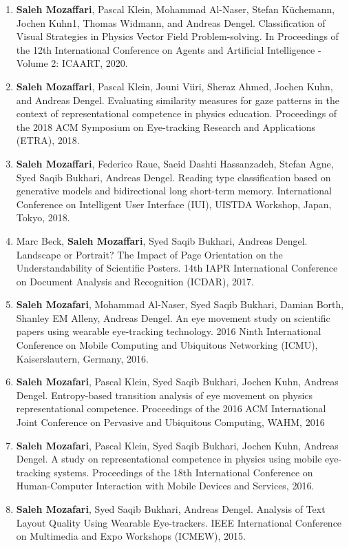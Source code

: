 \begin{enumerate}
	\item \textbf{Saleh Mozaffari}, Pascal Klein, Mohammad Al-Naser, Stefan Küchemann, Jochen Kuhn1, Thomas Widmann, and Andreas Dengel. Classification of Visual Strategies in Physics Vector Field Problem-solving. In Proceedings of the 12th International Conference on Agents and Artificial Intelligence - Volume 2: ICAART, 2020.
	\item \textbf{Saleh Mozaffari}, Pascal Klein, Jouni Viiri, Sheraz Ahmed, Jochen Kuhn, and Andreas Dengel.  Evaluating similarity measures for gaze patterns in the context of representational competence in physics education. Proceedings of the 2018 ACM Symposium on Eye-tracking Research and Applications (ETRA), 2018.
	\item \textbf{Saleh Mozaffari}, Federico Raue, Saeid Dashti Hassanzadeh, Stefan Agne, Syed Saqib Bukhari, Andreas Dengel. Reading type classification based on generative models and bidirectional long short-term memory. International Conference on Intelligent User Interface (IUI), UISTDA Workshop, Japan, Tokyo, 2018.
	\item Marc Beck, \textbf{Saleh Mozaffari}, Syed Saqib Bukhari, Andreas Dengel. Landscape or Portrait? The Impact of Page Orientation on the Understandability of Scientific Posters. 14th IAPR International Conference on Document Analysis and Recognition (ICDAR), 2017.
	\item \textbf{Saleh Mozafari}, Mohammad Al-Naser, Syed Saqib Bukhari, Damian Borth, Shanley EM Alleny, Andreas Dengel.  An eye movement study on scientific papers using wearable eye-tracking technology. 2016 Ninth International Conference on Mobile Computing and Ubiquitous Networking (ICMU), Kaiserslautern, Germany, 2016.
	\item \textbf{Saleh Mozafari}, Pascal Klein, Syed Saqib Bukhari, Jochen Kuhn, Andreas Dengel. Entropy-based transition analysis of eye movement on physics representational competence. Proceedings of the 2016 ACM International Joint Conference on Pervasive and Ubiquitous Computing, WAHM, 2016
	\item \textbf{Saleh Mozafari}, Pascal Klein, Syed Saqib Bukhari, Jochen Kuhn, Andreas Dengel. A study on representational competence in physics using mobile eye-tracking systems. Proceedings of the 18th International Conference on Human-Computer Interaction with Mobile Devices and Services, 2016.
	\item \textbf{Saleh Mozafari}, Syed Saqib Bukhari, Andreas Dengel. Analysis of Text Layout Quality Using Wearable Eye-trackers. IEEE  International Conference on Multimedia and Expo Workshops (ICMEW), 2015.

\end{enumerate}
